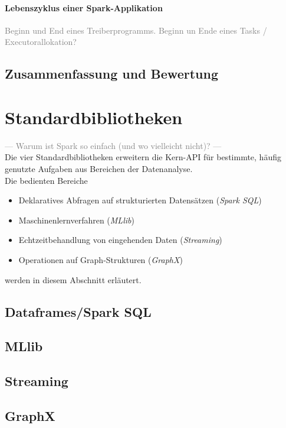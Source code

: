 \paragraph{Lebenszyklus einer Spark-Applikation}

\textcolor{gray}{Beginn und End eines Treiberprogramms. Beginn un Ende eines Tasks / Executorallokation?}\\

\subsection{Zusammenfassung und Bewertung}

\section{Standardbibliotheken}
\textcolor{gray}{--- Warum ist Spark so einfach (und wo vielleicht nicht)? ---}\\
Die vier Standardbibliotheken erweitern die Kern-API für bestimmte, häufig genutzte Aufgaben aus Bereichen der Datenanalyse.\\

Die bedienten Bereiche
\begin{itemize}
	\item Deklaratives Abfragen auf strukturierten Datensätzen (\textit{Spark SQL})
	\item Maschinenlernverfahren (\textit{MLlib})
	\item Echtzeitbehandlung von eingehenden Daten (\textit{Streaming})
	\item Operationen auf Graph-Strukturen (\textit{GraphX})
\end{itemize}
werden in diesem Abschnitt erläutert.

\subsection{Dataframes/Spark SQL}


\subsection{MLlib}
\subsection{Streaming}
\subsection{GraphX}

